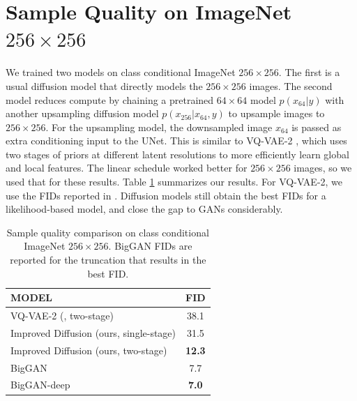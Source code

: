 \documentclass{article}
\begin{document}
\section{Sample Quality on ImageNet $256 \times 256$}
We trained two models on class conditional ImageNet $256 \times 256$. The first is a usual diffusion model that directly models the $256 \times 256$ images. The second model reduces compute by chaining a pretrained $64 \times 64$ model $p(x_{64}|y)$ with another upsampling diffusion model $p(x_{256}|x_{64}, y)$ to upsample images to $256 \times 256$. For the upsampling model, the downsampled image $x_{64}$  is passed as extra conditioning input to the UNet. This is similar to VQ-VAE-2 \citep{vqvae2}, which uses two stages of priors at different latent resolutions to more efficiently learn global and local features. The linear schedule worked better for $256 \times 256$ images, so we used that for these results. Table \ref{tbl:classcond256fid} summarizes our results. For VQ-VAE-2, we use the FIDs reported in \cite{cas}. Diffusion models still obtain the best FIDs for a likelihood-based model, and close the gap to GANs considerably. 

\begin{table}[ht]
    \centering
    \begin{tabular}{l|c}
        \bf MODEL & \bf FID \\
        \hline
        VQ-VAE-2 (\cite{vqvae2}, two-stage) & 38.1 \\
        Improved Diffusion (ours, single-stage) & 31.5 \\
        Improved Diffusion (ours, two-stage) & \bf{12.3} \\ 
        BigGAN \citep{biggan} & 7.7 \\
        BigGAN-deep \citep{biggan} & \bf{7.0} \\
    \end{tabular}
    \caption{\label{tbl:classcond256fid} Sample quality comparison on class conditional ImageNet $256 \times 256$. BigGAN FIDs are reported for the truncation that results in the best FID.}
\end{table}
\end{document}
